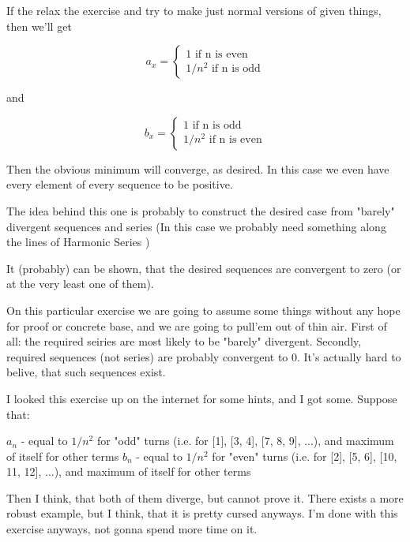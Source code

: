 \documentclass[11pt,oneside,titlepage]{article}
\begin{document}
If the relax the exercise and try to make just normal versions of given things, then we'll get

\begin{equation}
  a_x =
  \begin{cases}
    1 \text{ if n is even} \\
    1/n^2 \text{ if n is odd}
  \end{cases}
\end{equation}

and

\begin{equation}
  b_x =
  \begin{cases}
    1 \text{ if n is odd} \\
    1/n^2 \text{ if n is even}
  \end{cases}
\end{equation}

Then the obvious minimum will converge, as desired. In this case we even have
every element of every sequence to be positive.

The idea behind this one is probably to construct the desired case from
"barely" divergent sequences and series (In this case we probably need
something along the lines of Harmonic Series )

It (probably) can be shown, that the desired sequences are convergent to zero
(or at the very least one of them).

On this particular exercise we are going to assume some things without any
hope for proof or concrete base, and we are going to pull'em out of thin air.
First of all: the required seiries are most likely to be "barely" divergent.
Secondly, required sequences (not series) are probably convergent to 0. It's
actually hard to belive, that such sequences exist.

I looked this exercise up on the internet for some hints, and I got some.
Suppose that:

$a_n$ - equal to $1/n^2$ for "odd" turns (i.e. for [1], [3, 4], [7, 8, 9], ...),
and maximum of itself for other terms
$b_n$ - equal to $1/n^2$ for "even" turns (i.e. for [2], [5, 6], [10, 11, 12], ...), and maximum of itself for other terms

Then I think, that both of them diverge, but cannot prove it. There exists a
more robust example, but I think, that it is pretty cursed anyways. I'm done
with this exercise anyways, not gonna spend more time on it.
\end{document}

